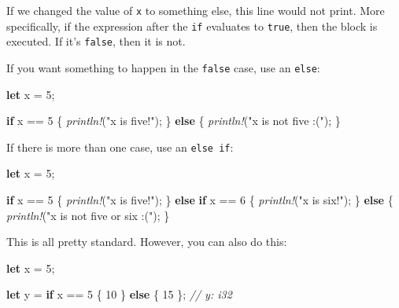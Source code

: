 \documentclass[a4paper,]{book}
\newenvironment{Shaded}{\begin{snugshade}}{\end{snugshade}}
\newcommand{\KeywordTok}[1]{\textcolor[rgb]{0.13,0.29,0.53}{\textbf{{#1}}}}
\newcommand{\DecValTok}[1]{\textcolor[rgb]{0.00,0.00,0.81}{{#1}}}
\newcommand{\StringTok}[1]{\textcolor[rgb]{0.31,0.60,0.02}{{#1}}}
\newcommand{\CommentTok}[1]{\textcolor[rgb]{0.56,0.35,0.01}{\textit{{#1}}}}
\newcommand{\PreprocessorTok}[1]{\textcolor[rgb]{0.56,0.35,0.01}{\textit{{#1}}}}
\newcommand{\NormalTok}[1]{{#1}}
\begin{document}
If we changed the value of \texttt{x} to something else, this line would
not print. More specifically, if the expression after the \texttt{if}
evaluates to \texttt{true}, then the block is executed. If it's
\texttt{false}, then it is not.

If you want something to happen in the \texttt{false} case, use an
\texttt{else}:

\begin{Shaded}
\begin{Highlighting}[]
\KeywordTok{let} \NormalTok{x = }\DecValTok{5}\NormalTok{;}

\KeywordTok{if} \NormalTok{x == }\DecValTok{5} \NormalTok{\{}
    \PreprocessorTok{println!}\NormalTok{(}\StringTok{"x is five!"}\NormalTok{);}
\NormalTok{\} }\KeywordTok{else} \NormalTok{\{}
    \PreprocessorTok{println!}\NormalTok{(}\StringTok{"x is not five :("}\NormalTok{);}
\NormalTok{\}}
\end{Highlighting}
\end{Shaded}

If there is more than one case, use an \texttt{else\ if}:

\begin{Shaded}
\begin{Highlighting}[]
\KeywordTok{let} \NormalTok{x = }\DecValTok{5}\NormalTok{;}

\KeywordTok{if} \NormalTok{x == }\DecValTok{5} \NormalTok{\{}
    \PreprocessorTok{println!}\NormalTok{(}\StringTok{"x is five!"}\NormalTok{);}
\NormalTok{\} }\KeywordTok{else} \KeywordTok{if} \NormalTok{x == }\DecValTok{6} \NormalTok{\{}
    \PreprocessorTok{println!}\NormalTok{(}\StringTok{"x is six!"}\NormalTok{);}
\NormalTok{\} }\KeywordTok{else} \NormalTok{\{}
    \PreprocessorTok{println!}\NormalTok{(}\StringTok{"x is not five or six :("}\NormalTok{);}
\NormalTok{\}}
\end{Highlighting}
\end{Shaded}

This is all pretty standard. However, you can also do this:

\begin{Shaded}
\begin{Highlighting}[]
\KeywordTok{let} \NormalTok{x = }\DecValTok{5}\NormalTok{;}

\KeywordTok{let} \NormalTok{y = }\KeywordTok{if} \NormalTok{x == }\DecValTok{5} \NormalTok{\{}
    \DecValTok{10}
\NormalTok{\} }\KeywordTok{else} \NormalTok{\{}
    \DecValTok{15}
\NormalTok{\}; }\CommentTok{// y: i32}
\end{Highlighting}
\end{Shaded}
\end{document}
